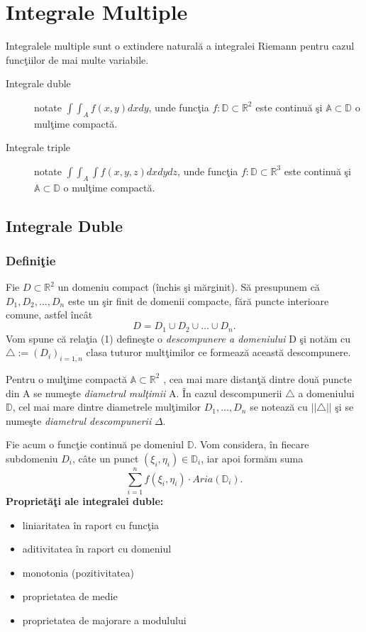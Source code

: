 \documentclass{article}
\begin{document}
\section{Integrale Multiple}
Integralele multiple sunt o extindere natural\u a a integralei Riemann pentru cazul func\c tiilor de mai multe variabile. \cite{text3}
\begin{description}
\item[Integrale duble] notate $\int\int_{A} f(x, y)dx dy$, unde func\c tia $ f : \mathbb{D} \subset \mathbb{R}^2$ este continu\u a \c si $\mathbb{A} \subset \mathbb{D}$ o mul\c time compact\u a.
\item[Integrale triple] notate $\int\int_{A}\int f(x, y, z)dx dy dz$, unde func\c tia $ f : \mathbb{D} \subset \mathbb{R}^3$ este continu\u a \c si $\mathbb{A} \subset \mathbb{D}$ o mul\c time compact\u a.
\end{description}
\subsection{Integrale Duble}
\subsubsection{Defini\c tie}
Fie $D \subset \mathbb{R}^2$ un domeniu compact (\^ inchis \c si m\u arginit). S\u a presupunem c\u a $D_1, D_2, \dots , D_n$ este un \c sir finit de domenii compacte, f\u ar\u a puncte interioare comune, astfel \^ inc\^ at
\begin{equation}
D = D_1 \cup D_2 \cup \dots \cup D_n.
\end{equation}
Vom spune c\u a rela\c tia (1) define\c ste o \emph {descompunere a domeniului} D \c si not\u am cu $\triangle := {(D_i)}_{i=\overline{1,n}}$ clasa tuturor mult\c timilor ce formeaz\u a aceast\u a descompunere. \par
Pentru o mul\c time compact\u a $\mathbb{A} \subset \mathbb{R}^2$ , cea mai mare distan\c t\u a dintre dou\u a puncte din A se nume\c ste \emph {diametrul mul\c timii}  A. \^ In cazul descompunerii $\triangle$ a domeniului  $\mathbb{D}$, cel mai mare dintre diametrele mul\c timilor $D_1, \dots , D_n$ se noteaz\u a cu $ ||\triangle||$ \c si se nume\c ste \emph {diametrul descompunerii} $\Delta$. \cite{text5} \par
Fie acum o func\c tie continu\u a pe domeniul  $\mathbb{D}$. Vom considera, \^ in fiecare subdomeniu $D_i$, c\^ate un punct  $({\xi}_i, {\eta}_i) \in  {\mathbb{D}}_i$, iar apoi form\u am suma
\begin{equation}
\sum_{i = 1}^n f({\xi}_i, {\eta}_i) \cdot Aria({\mathbb{D}}_i).
\end{equation}
{\bf Propriet\u a\c ti ale integralei duble:}
\begin{itemize}
\item liniaritatea \^ in raport cu func\c tia
\item aditivitatea \^ in raport cu domeniul 
\item monotonia (pozitivitatea)
\item proprietatea de medie
\item proprietatea de majorare a modulului
\end{itemize}
\end{document}
